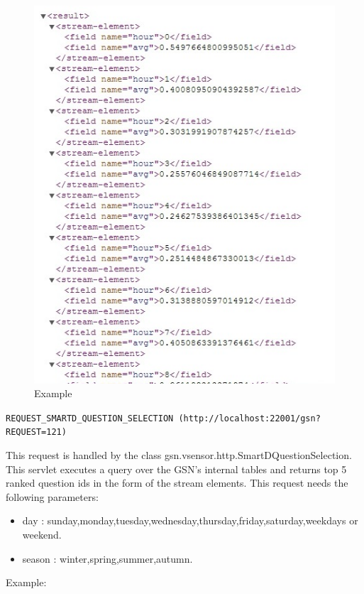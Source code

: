 \documentclass[12pt]{article}
\begin{document}
\begin{figure}
		\centering
			\includegraphics{REQUEST_SMARTD_SIMILARITY.JPG}
		\caption{Example}
\end{figure}


\vspace{1cm}

\texttt{REQUEST\_SMARTD\_QUESTION\_SELECTION (http://localhost:22001/gsn?REQUEST=121)}

\vspace{0.5cm}

This request is handled by the class gsn.vsensor.http.SmartDQuestionSelection. This servlet executes a query over the GSN's internal tables and returns top 5 ranked question ids in the form of the stream elements. This request needs the following parameters: 

\begin{itemize}
  \item day : sunday,monday,tuesday,wednesday,thursday,friday,saturday,weekdays or weekend.
  \item season : winter,spring,summer,autumn.
\end{itemize}
      
Example:  \\
  
\end{document}
